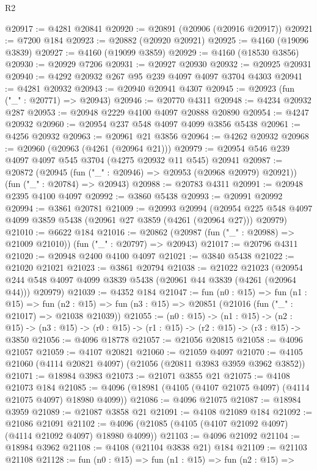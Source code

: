 \begin{lexlean}{R2}
\begin{coremodule}
@20917 := @4281 @20841
@20920 := @20891 (@20906 (@20916 @20917))
@20921 := @7200 @184
@20923 := @20882 (@20920 @20921)
@20925 := @4160 (@19096 @3839)
@20927 := @4160 (@19099 @3859)
@20929 := @4160 (@18530 @3856)
@20930 := @20929 @7206
@20931 := @20927 @20930
@20932 := @20925 @20931
@20940 := @4292 @20932 @267 @95 @239 @4097 @4097 @3704 @4303
@20941 := @4281 @20932
@20943 := @20940 @20941 @4307
@20945 := @20923 (fun ("_" : @20771) => @20943)
@20946 := @20770 @4311
@20948 := @4234 @20932 @287
@20953 := @20948 @2229 @4100 @4097 @20888 @20890
@20954 := @4247 @20932
@20960 := @20954 @237 @548 @4097 @4099 @3856 @5438
@20961 := @4256 @20932
@20963 := @20961 @21 @3856
@20964 := @4262 @20932
@20968 := @20960 (@20963 (@4261 (@20964 @21)))
@20979 := @20954 @546 @239 @4097 @4097 @545 @3704 (@4275 @20932 @11 @545) @20941
@20987 := @20872
    (@20945 (fun ("_" : @20946) => @20953 (@20968 @20979) @20921))
    (fun ("_" : @20784) => @20943)
@20988 := @20783 @4311
@20991 := @20948 @2395 @4100 @4097
@20992 := @3860 @5438
@20993 := @20991 @20992
@20994 := @3861 @20781
@21009 := @20993
    @20994
    (@20954 @225 @548 @4097 @4099 @3859 @5438 (@20961 @27 @3859 (@4261 (@20964 @27))) @20979)
@21010 := @6622 @184
@21016 := @20862 (@20987 (fun ("_" : @20988) => @21009 @21010)) (fun ("_" : @20797) => @20943)
@21017 := @20796 @4311
@21020 := @20948 @2400 @4100 @4097
@21021 := @3840 @5438
@21022 := @21020 @21021
@21023 := @3861 @20794
@21038 := @21022
    @21023
    (@20954 @244 @548 @4097 @4099 @3839 @5438 (@20961 @44 @3839 (@4261 (@20964 @44))) @20979)
@21039 := @4352 @184
@21047 := fun (n0 : @15) =>
  fun (n1 : @15) =>
  fun (n2 : @15) => fun (n3 : @15) => @20851 (@21016 (fun ("_" : @21017) => @21038 @21039))
@21055 := (n0 : @15) ->
  (n1 : @15) ->
  (n2 : @15) -> (n3 : @15) -> (r0 : @15) -> (r1 : @15) -> (r2 : @15) -> (r3 : @15) -> @3850
@21056 := @4096 @18778
@21057 := @21056 @20815
@21058 := @4096 @21057
@21059 := @4107 @20821
@21060 := @21059 @4097
@21070 := @4105 @21060 (@4114 @20821 @4097) (@21056 (@20811 @3983 @3959 @3962 @3852))
@21071 := @18984 @3983
@21073 := @21071 @3855 @21
@21075 := @4108 @21073 @184
@21085 := @4096 (@18981 (@4105 (@4107 @21075 @4097) (@4114 @21075 @4097) @18980 @4099))
@21086 := @4096 @21075
@21087 := @18984 @3959
@21089 := @21087 @3858 @21
@21091 := @4108 @21089 @184
@21092 := @21086 @21091
@21102 := @4096 (@21085 (@4105 (@4107 @21092 @4097) (@4114 @21092 @4097) @18980 @4099))
@21103 := @4096 @21092
@21104 := @18984 @3962
@21108 := @4108 (@21104 @3838 @21) @184
@21109 := @21103 @21108
@21128 := fun (n0 : @15) =>
  fun (n1 : @15) =>
  fun (n2 : @15) =>

\end{coremodule}
\end{lexlean}
